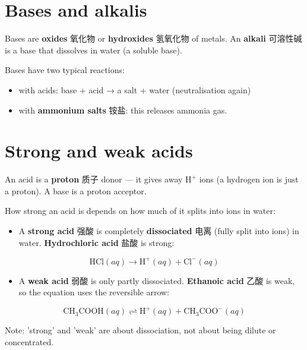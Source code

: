 \documentclass[11pt]{article}
\begin{document}
\section*{Bases and alkalis}

Bases are \textbf{oxides} 氧化物 or \textbf{hydroxides} 氢氧化物 of metals. An \textbf{alkali} 可溶性碱 is a base that dissolves in water (a soluble base).

Bases have two typical reactions:

\begin{itemize}
\item with acids: base + acid → a salt + water (neutralisation again)

\item with \textbf{ammonium salts} 铵盐: this releases ammonia gas.

\end{itemize}

\section*{Strong and weak acids}

An acid is a \textbf{proton} 质子 donor — it gives away $\text{H}^{+}$ ions (a hydrogen ion is just a proton). A base is a proton acceptor.

How strong an acid is depends on how much of it splits into ions in water:

\begin{itemize}
\item A \textbf{strong acid} 强酸 is completely \textbf{dissociated} 电离 (fully split into ions) in water. \textbf{Hydrochloric acid} 盐酸 is strong:

\end{itemize}

\[
\text{HCl}(aq) \rightarrow \text{H}^{+}(aq) + \text{Cl}^{-}(aq)
\]

\begin{itemize}
\item A \textbf{weak acid} 弱酸 is only partly dissociated. \textbf{Ethanoic acid} 乙酸 is weak, so the equation uses the reversible arrow:

\end{itemize}

\[
\text{CH}_3\text{COOH}(aq) \rightleftharpoons \text{H}^{+}(aq) + \text{CH}_3\text{COO}^{-}(aq)
\]

Note: 'strong' and 'weak' are about dissociation, not about being dilute or concentrated.
\end{document}

